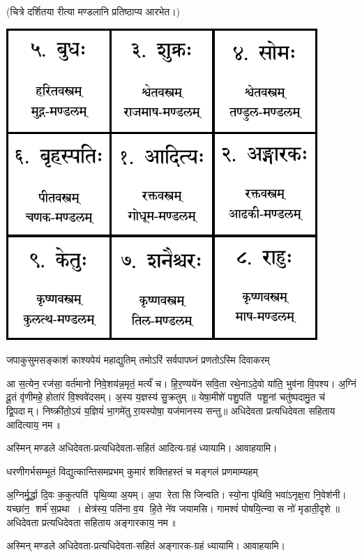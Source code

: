 
(चित्रे दर्शितया रीत्या मण्डलानि प्रतिष्ठाप्य आरभेत।)

\centerline{\includegraphics{purvanga/navagraha-diagram.pdf}}

\twolineshloka
{जपाकुसुमसङ्काशं काश्यपेयं महाद्युतिम्}
{तमोऽरिं सर्वपापघ्नं प्रणतोऽस्मि दिवाकरम्}

आ स॒त्येन॒ रज॑सा॒ वर्त॑मानो निवे॒शय॑न्न॒मृतं॒ मर्त्यं॑ च। हि॒र॒ण्यये॑न सवि॒ता रथे॒नाऽदे॒वो या॑ति॒
भुव॑ना वि॒पश्य\sn{}। अ॒ग्निं दू॒तं वृ॑णीमहे॒ होता॑रं वि॒श्ववे॑दसम्। अ॒स्य य॒ज्ञस्य॑ सु॒क्रतुम्॥
येषा॒मीशे॑ पशु॒पति॑ पशू॒नां चतु॑ष्पदामु॒त च॑ द्वि॒पदाम्। निष्क्री॑तो॒ऽयं य॒ज्ञियं॑ भा॒गमे॑तु
रा॒यस्पोषा॒ यज॑मानस्य सन्तु॥  अधिदेवता प्रत्यधिदेवता सहिताय आदित्याय॒ नम॥ 

अस्मिन् मण्डले अधिदेवता-प्रत्यधिदेवता-सहितं आदित्य-ग्रहं ध्यायामि। आवाहयामि।

\twolineshloka
{धरणीगर्भसम्भूतं विद्युत्कान्तिसमप्रभम्}
{कुमारं शक्तिहस्तं च मङ्गलं प्रणमाम्यहम्}

अ॒ग्निर्मू॒र्द्धा दि॒वः क॒कुत्पति॑ पृथि॒व्या अ॒यम्। अ॒पा रेतासि जिन्वति। स्यो॒ना पृ॑थिवि॒
भवा॑ऽनृक्ष॒रा नि॒वेश॑नी। यच्छा॑न॒ शर्म॑ स॒प्रथा। क्षेत्र॑स्य॒ पति॑ना व॒य हि॒ते ने॑व जयामसि।
गामश्वं॑ पोषयि॒त्न्वा स नो॑ मृडाती॒दृशे॥  अधिदेवता प्रत्यधिदेवता सहिताय अङ्गारकाय॒ नम॥ 

अस्मिन् मण्डले अधिदेवता-प्रत्यधिदेवता-सहितं अङ्गारक-ग्रहं ध्यायामि। आवाहयामि।


